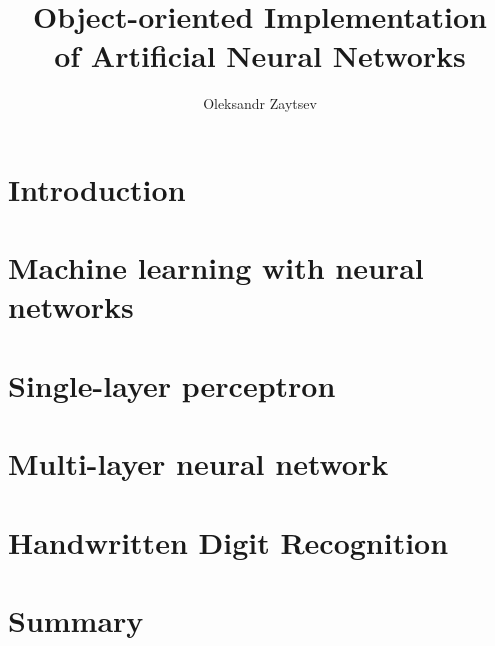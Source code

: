 \documentclass[a4paper, 12pt, oneside]{book}
\title{Object-oriented Implementation \\
       of Artificial Neural Networks}
\author{Oleksandr Zaytsev}
\begin{document}
  \maketitle
  \tableofcontents
  
  \chapter{Introduction}
  
  
  \chapter{Machine learning with neural networks}
  
  
  \chapter{Single-layer perceptron}
  
  
  \chapter{Multi-layer neural network}
  
  
  \chapter{Handwritten Digit Recognition}
  
  
  \chapter*{Summary}
  
  
%   
  
  
\end{document}
